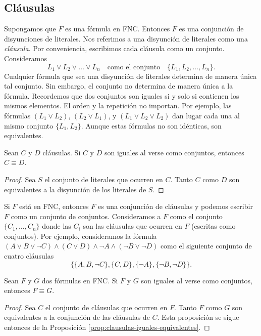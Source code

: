 \message{ !name(main.tex)}\documentclass[12pt,a4paper]{book}
\begin{document}
    \subsection{Cláusulas}

    Supongamos que $F$ es una fórmula en FNC. Entonces $F$ es una conjunción de disyunciones de literales. Nos referimos a
    una disyunción de literales como una \textit{cláusula}. Por conveniencia, escribimos cada cláusula como un conjunto.
    Consideramos
    \begin{equation*}
        L_{1}\vee L_{2}\vee\dots\vee L_{n}\quad\text{como el conjunto}\quad\{L_{1},L_{2},\dots,L_{n}\}.
    \end{equation*}
    Cualquier fórmula que sea una disyunción de literales determina de manera única tal conjunto. Sin embargo, el conjunto no
    determina de manera única a la fórmula. Recordemos que dos conjuntos son iguales si y solo si contienen los mismos
    elementos. El orden y la repetición no importan. Por ejemplo, las fórmulas $(L_{1}\vee L_{2})$, $(L_{2}\vee L_{1})$, y
    $(L_{1}\vee L_{2}\vee L_{2})$ dan lugar cada una al mismo conjunto $\{L_{1},L_{2}\}$. Aunque estas fórmulas no son
    idénticas, son equivalentes.

    \begin{proposicion}\label{prop:clausulas-iguales-equivalentes}
        Sean $C$ y $D$ cláusulas. Si $C$ y $D$ son iguales al verse como conjuntos, entonces $C\equiv D$.
    \end{proposicion}
    \begin{proof}
        Sea $S$ el conjunto de literales que ocurren en $C$. Tanto $C$ como $D$ son equivalentes a la disyunción de los
        literales de $S$.
    \end{proof}

    Si $F$ está en FNC, entonces $F$ es una conjunción de cláusulas y podemos escribir $F$ como un conjunto de conjuntos.
    Consideramos a $F$ como el conjunto $\{C_{1},\dots,C_{n}\}$ donde las $C_{i}$ son las cláusulas que ocurren en $F$
    (escritas como conjuntos). Por ejemplo, consideramos la fórmula
    $(A\vee B\vee\neg C)\wedge(C\vee D)\wedge\neg A\wedge(\neg B\vee\neg D)$ como el siguiente conjunto de cuatro cláusulas
    \begin{equation*}
        \{\{A,B,\neg C\},\{C,D\},\{\neg A\},\{\neg B,\neg D\}\}.
    \end{equation*}

    \begin{proposicion}\label{prop:formulas-fnc-iguales-equivalentes}
        Sean $F$ y $G$ dos fórmulas en FNC. Si $F$ y $G$ son iguales al verse como conjuntos, entonces $F\equiv G$.
    \end{proposicion}
    \begin{proof}
        Sea $C$ el conjunto de cláusulas que ocurren en $F$. Tanto $F$ como $G$ son equivalentes a la conjunción de las
        cláusulas de $C$. Esta proposición se sigue entonces de la Proposición \ref{prop:clausulas-iguales-equivalentes}.
    \end{proof}
\end{document}
